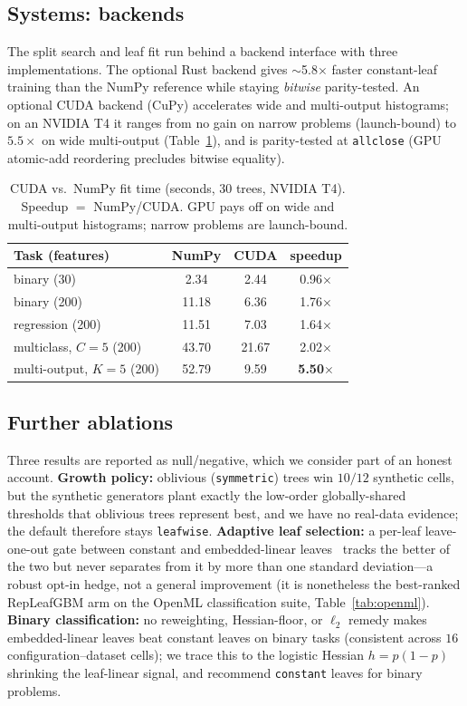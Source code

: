 \documentclass[11pt]{article}
\begin{document}
\subsection{Systems: backends}
\label{sec:exp-systems}

The split search and leaf fit run behind a backend interface with three
implementations. The optional Rust backend gives $\sim$5.8$\times$ faster constant-leaf
training than the NumPy reference while staying \emph{bitwise} parity-tested. An optional
CUDA backend (CuPy) accelerates wide and multi-output histograms; on an NVIDIA T4 it ranges
from no gain on narrow problems (launch-bound) to $5.5\times$ on wide multi-output
(Table~\ref{tab:gpu}), and is parity-tested at \texttt{allclose} (GPU atomic-add reordering
precludes bitwise equality).

\begin{table}[t]
\centering
\caption{CUDA vs.\ NumPy fit time (seconds, 30 trees, NVIDIA T4). Speedup $=$
NumPy/CUDA. GPU pays off on wide and multi-output histograms; narrow problems are
launch-bound.}
\label{tab:gpu}
\begin{tabular}{lccc}
\toprule
Task (features) & NumPy & CUDA & speedup \\
\midrule
binary (30)            & 2.34  & 2.44  & 0.96$\times$ \\
binary (200)           & 11.18 & 6.36  & 1.76$\times$ \\
regression (200)       & 11.51 & 7.03  & 1.64$\times$ \\
multiclass, $C{=}5$ (200) & 43.70 & 21.67 & 2.02$\times$ \\
multi-output, $K{=}5$ (200) & 52.79 & 9.59 & \textbf{5.50$\times$} \\
\bottomrule
\end{tabular}
\end{table}

\subsection{Further ablations}
\label{sec:exp-ablations}

Three results are reported as null/negative, which we consider part of an honest account.
\textbf{Growth policy:} oblivious (\texttt{symmetric}) trees win $10/12$ synthetic cells,
but the synthetic generators plant exactly the low-order globally-shared thresholds that
oblivious trees represent best, and we have no real-data evidence; the default therefore
stays \texttt{leafwise}. \textbf{Adaptive leaf selection:} a per-leaf leave-one-out gate
between constant and embedded-linear leaves~\citep{golub1979gcv} tracks the better of the
two but never separates from it by more than one standard deviation---a robust opt-in
hedge, not a general improvement (it is nonetheless the best-ranked RepLeafGBM arm on the
OpenML classification suite, Table~\ref{tab:openml}). \textbf{Binary classification:} no
reweighting, Hessian-floor, or $\ell_2$ remedy makes embedded-linear leaves beat constant
leaves on binary tasks (consistent across $16$ configuration--dataset cells); we trace this
to the logistic Hessian $h=p(1-p)$ shrinking the leaf-linear signal, and recommend
\texttt{constant} leaves for binary problems.
\end{document}
